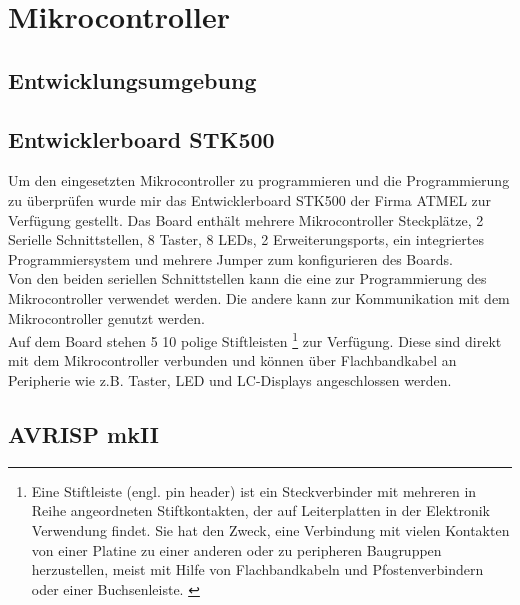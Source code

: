 \section{Mikrocontroller}
\subsection{Entwicklungsumgebung}
\subsection{Entwicklerboard STK500}
Um den eingesetzten Mikrocontroller zu programmieren und die Programmierung zu überprüfen wurde mir das Entwicklerboard STK500 der Firma ATMEL zur Verfügung gestellt. Das Board enthält mehrere Mikrocontroller Steckplätze, 2 Serielle Schnittstellen, 8 Taster, 8 LEDs, 2 Erweiterungsports, ein integriertes Programmiersystem  und mehrere Jumper zum konfigurieren des Boards.\\
Von den beiden seriellen Schnittstellen kann die eine zur Programmierung des Mikrocontroller verwendet werden. Die andere kann zur Kommunikation mit dem Mikrocontroller genutzt werden.\\
Auf dem Board stehen 5 10 polige Stiftleisten 
\footnote{Eine Stiftleiste (engl. pin header) ist ein Steckverbinder mit mehreren in Reihe angeordneten Stiftkontakten, der auf Leiterplatten in der Elektronik Verwendung findet. Sie hat den Zweck, eine Verbindung mit vielen Kontakten von einer Platine zu einer anderen oder zu peripheren Baugruppen herzustellen, meist mit Hilfe von Flachbandkabeln und Pfostenverbindern oder einer Buchsenleiste. \cite{wiki_pinh} }
zur Verfügung. Diese sind direkt mit dem Mikrocontroller verbunden und können über Flachbandkabel an Peripherie wie z.B. Taster, LED und LC-Displays angeschlossen werden.
\subsection{AVRISP mkII}
